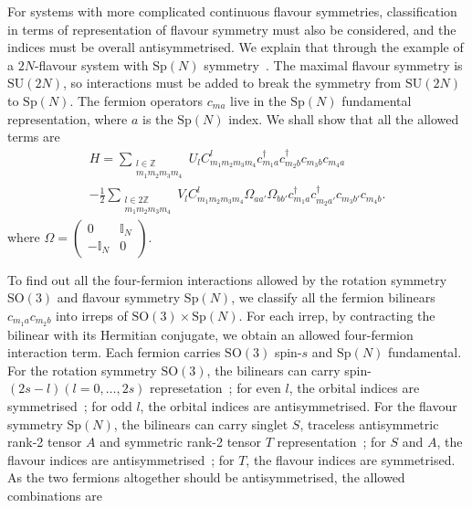 \documentclass{timesjhep}
\begin{document}
For systems with more complicated continuous flavour symmetries, classification in terms of representation of flavour symmetry must also be considered, and the indices must be overall antisymmetrised. We explain that through the example of a $2N$-flavour system with $\mathrm{Sp}(N)$ symmetry~\cite{Zhou2024Oct}. The maximal flavour symmetry is $\mathrm{SU}(2N)$, so interactions must be added to break the symmetry from $\mathrm{SU}(2N)$ to $\mathrm{Sp}(N)$. The fermion operators $c_{ma}$ live in the $\mathrm{Sp}(N)$ fundamental representation, where $a$ is the $\mathrm{Sp}(N)$ index. We shall show that all the allowed terms are
\begin{multline}
    H=\sum_{\substack{l\in\mathbb{Z}\\m_1m_2m_3m_4}}U_lC^l_{m_1m_2m_3m_4}c^\dagger_{m_1a}c^\dagger_{m_2b}c_{m_3b}c_{m_4a}\\
    -\frac{1}{2}\sum_{\substack{l\in 2\mathbb{Z}\\m_1m_2m_3m_4}}V_lC^l_{m_1m_2m_3m_4}\Omega_{aa'}\Omega_{bb'}c^\dagger_{m_1a}c^\dagger_{m_2a'}c_{m_3b'}c_{m_4b}.
\end{multline}
where $\Omega=\begin{pmatrix}0&\mathbb{I}_N\\-\mathbb{I}_N&0\end{pmatrix}$.

To find out all the four-fermion interactions allowed by the rotation symmetry $\mathrm{SO}(3)$ and flavour symmetry $\mathrm{Sp}(N)$, we classify all the fermion bilinears $c_{m_1a}c_{m_2b}$ into irreps of $\mathrm{SO}(3)\times\mathrm{Sp}(N)$. For each irrep, by contracting the bilinear with its Hermitian conjugate, we obtain an allowed four-fermion interaction term. Each fermion carries $\mathrm{SO}(3)$ spin-$s$ and $\mathrm{Sp}(N)$ fundamental. For the rotation symmetry $\mathrm{SO}(3)$, the bilinears can carry spin-$(2s-l)(l=0,\dots,2s)$ represetation~; for even $l$, the orbital indices are symmetrised~; for odd $l$, the orbital indices are antisymmetrised. For the flavour symmetry $\mathrm{Sp}(N)$, the bilinears can carry singlet $S$, traceless antisymmetric rank-2 tensor $A$ and symmetric rank-2 tensor $T$ representation~; for $S$ and $A$, the flavour indices are antisymmetrised~; for $T$, the flavour indices are symmetrised. As the two fermions altogether should be antisymmetrised, the allowed combinations are
\end{document}
